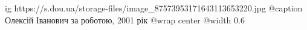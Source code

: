 
 
 
 
 

\ifcmt
  ig https://s.dou.ua/storage-files/image_87573953171643113653220.jpg
  @caption Олексій Іванович за роботою, 2001 рік
	@wrap center
	@width 0.6
\fi
